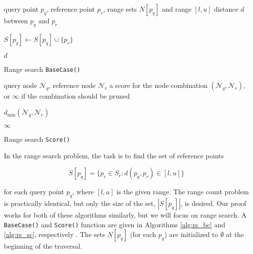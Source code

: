 \begin{algorithm}[tb]
\begin{algorithmic}[1]
     query point $p_q$, reference point $p_r$, range
sets $N[p_q]$ and range $[l, u]$
     distance $d$ between $p_q$ and $p_r$


    \STATE  $S[p_q] \gets S[p_q] \cup \{ p_r \}$
    \ENDIF

    \RETURN $d$
  \end{algorithmic}
  \caption{Range search \texttt{BaseCase()}}
  \label{alg:rs_bc}
\end{algorithm}

\begin{algorithm}[tb]
  \begin{algorithmic}[1]
     query node $\mathscr{N}_q$, reference node
$\mathscr{N}_r$
     a score for the node combination $(\mathscr{N}_q,
\mathscr{N}_r)$, or $\infty$ if the combination should be pruned

    \medskip

      \RETURN $d_{\min}(\mathscr{N}_q, \mathscr{N}_r)$
    \ENDIF

    \RETURN $\infty$
  \end{algorithmic}
  \caption{Range search \texttt{Score()}}
  \label{alg:rs_sc}
\end{algorithm}

In the range search problem, the task is to find the set of reference points

\begin{equation}
S[p_q] = \{ p_r \in S_r : d(p_q, p_r) \in [l, u] \}
\end{equation}

\noindent for each query point $p_q$, where $[l, u]$ is the given
range.  The range count problem is practically identical, but only the size of
the set, $|S[p_q]|$, is desired.
Our proof works for both of these algorithms
similarly, but we will focus on range search.  A \texttt{BaseCase()} and
\texttt{Score()} function are given in Algorithms \ref{alg:rs_bc} and
\ref{alg:rs_sc}, respectively \citep[a correctness proof can be found
in][]{curtin2013tree}.  The sets $N[p_q]$ (for each $p_q$) are
initialized to $\emptyset$ at the beginning of the traversal.


